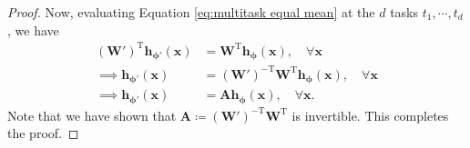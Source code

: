 \documentclass[10pt]{article} %
\theoremstyle{plain}
\theoremstyle{definition}
\begin{document}
\begin{proof}
    Now, evaluating Equation \eqref{eq:multitask equal mean} at the $d$ tasks $t_1,\cdots,t_d$, we have
    \begin{align}
        (\mathbf{W}')^{\text{T}}\mathbf{h}_{\boldsymbol{\phi}'}(\mathbf{x})
        &=\mathbf{W}^{\text{T}}\mathbf{h}_{\boldsymbol{\phi}}(\mathbf{x}),\quad\forall\mathbf{x}\\
        \implies \mathbf{h}_{\boldsymbol{\phi}'}(\mathbf{x})
        &=(\mathbf{W}')^{-\text{T}}\mathbf{W}^{\text{T}}\mathbf{h}_{\boldsymbol{\phi}}(\mathbf{x}),\quad\forall\mathbf{x}\\
        \implies \mathbf{h}_{\boldsymbol{\phi}'}(\mathbf{x})
        &=\mathbf{A}\mathbf{h}_{\boldsymbol{\phi}}(\mathbf{x}),\quad\forall\mathbf{x}.
    \end{align}
    Note that we have shown that $\mathbf{A}\coloneqq(\mathbf{W}')^{-\text{T}}\mathbf{W}^{\text{T}}$ is invertible. This completes the proof.
\end{proof}
\end{document}
